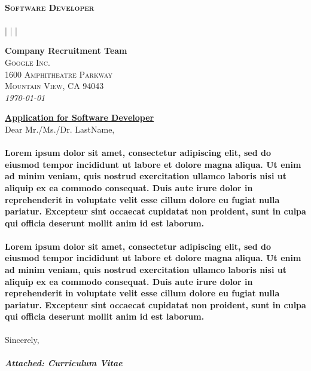 \documentclass[11pt, a4paper]{article}
\newcommand{\name}[2]{
	{\fontsize{40}{50}\selectfont \textcolor{body}{#1}}
    {\bfseries\fontsize{40}{50}\selectfont #2}}
\newcommand{\position}[1]{
	{\bfseries\textcolor{accent}{\small\scshape{#1}}}\vspace{2pt}
}
\newcommand{\address}[1]{
	\faMapMarker\space\textit{#1}\vspace{2pt}
}
\newcommand{\mobile}[1]{\small{\faPhone\space{#1}}}
\newcommand{\email}[1]{\small{\faEnvelope\space{#1}}}
\newcommand{\github}[1]{\small{\faGithubAlt\space{#1}}}
\newcommand{\linkedin}[1]{\small{\faLinkedin\space{#1}}}
\newcommand{\recipient}[2]{{\noindent\bfseries #1}\\ {\small\scshape{#2}}}
\newcommand{\appltitle}[1]{{\noindent\bfseries\underline{#1}}\vspace{2pt}}
\newcommand{\greeting}[1]{#1}
\newcommand{\letterparagraph}[1]{\addvspace{2.5ex}\paragraph{\textnormal{#1}}}
\newcommand{\salutations}[2]{\noindent#1\vspace{3.4mm} \\ \bfseries{#2}}
\newcommand{\encl}[1]{\textcolor{light}{\mdseries\textit{#1}}}
\begin{document}
  \begin{flushright}
      \name{\firstnametxt}{\lastnametxt}\\
      \position{Software Developer}\\
      \address{\addresstxt}\\
      \mobile{
      	\href{tel:\phonetxt}{\phonetxt}} |
      \email{
      	\href{mailto:\emailtxt}{\emailtxt}} |
      \linkedin{
      	\href{https://www.\linkedIntxt}{\linkedIntxt}} |
      \github{
      	\href{https://\githubtxt}{\githubtxt}}
      
  \end{flushright}
  
  \vspace{8.4mm}
  \recipient{Company Recruitment Team}{Google Inc.\\1600 Amphitheatre Parkway\\Mountain View, CA 94043}\\
  {\small\textit{\today}}
  \vspace{8.4mm}
  
  \appltitle{Application for Software Developer}\\
  \greeting{Dear Mr./Ms./Dr. LastName},
  
  \letterparagraph{Lorem ipsum dolor sit amet, consectetur adipiscing elit, sed do eiusmod tempor incididunt ut labore et dolore magna aliqua. Ut enim ad minim veniam, quis nostrud exercitation ullamco laboris nisi ut aliquip ex ea commodo consequat. Duis aute irure dolor in reprehenderit in voluptate velit esse cillum dolore eu fugiat nulla pariatur. Excepteur sint occaecat cupidatat non proident, sunt in culpa qui officia deserunt mollit anim id est laborum.}
    \letterparagraph{Lorem ipsum dolor sit amet, consectetur adipiscing elit, sed do eiusmod tempor incididunt ut labore et dolore magna aliqua. Ut enim ad minim veniam, quis nostrud exercitation ullamco laboris nisi ut aliquip ex ea commodo consequat. Duis aute irure dolor in reprehenderit in voluptate velit esse cillum dolore eu fugiat nulla pariatur. Excepteur sint occaecat cupidatat non proident, sunt in culpa qui officia deserunt mollit anim id est laborum.}
    
\hfill\vspace{\baselineskip}

    \salutations{Sincerely,}{\firstnametxt\space\lastnametxt}
    \vspace{8.4mm}\\
    \encl{Attached: Curriculum Vitae}
  
\end{document}
